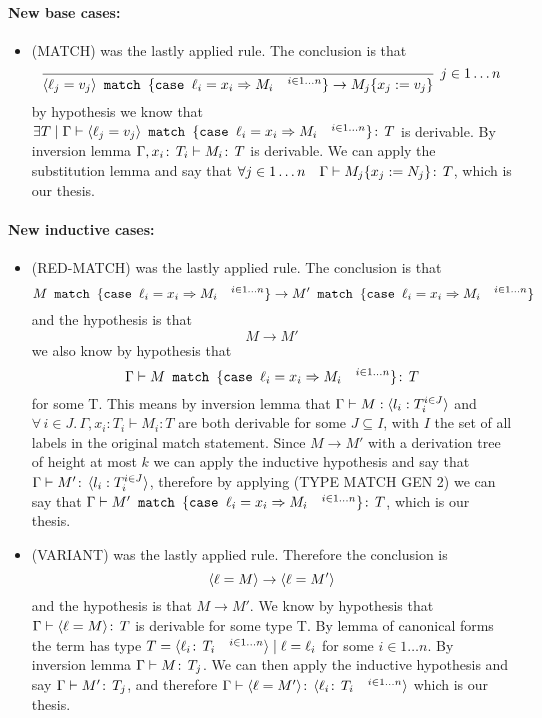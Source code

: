 \paragraph*{New base cases:\\}
\begin{itemize}
\item (MATCH) was the lastly applied rule. The conclusion is
  that \[\infer[j\in 1\dots n]{\MATCH{\VAR{\ell_j = v_j} }{
      \CASE{\ell_i}{x_i}{M_i} \quad^{i\in 1\dots n}} \to
    M_j\SUBST{x_j}{v_j}}{}\] by hypothesis we know that \(\exists T
  \mid \Gamma \vdash \langle \ell_j = v_j \rangle\texttt{ match }\{
    \texttt{case }\ell_i = x_i \Rightarrow M_i \quad^{i\in 1\dots n}\} \!:\,T\) is
  derivable. By inversion lemma \(\Gamma, x_i \!:\,T_i \vdash M_i
  \!:\,T\) is derivable. We can apply the substitution lemma and say
  that \(\forall j \in 1 \dots n \quad \Gamma \vdash M_j
  \{x_j:=N_j\} \!:\,T\), which is our thesis.
\end{itemize}

\paragraph*{New inductive cases:\\}
\begin{itemize}
\item (RED-MATCH) was the lastly applied rule. The conclusion is
  that \[M\texttt{ match }\{\texttt{case }\ell_i = x_i \Rightarrow M_i \quad ^{i\in 1\dots n}\} \to
  M'\texttt{ match }\{\texttt{case }\ell_i = x_i \Rightarrow M_i \quad ^{i\in 1\dots n}\}\] and the
  hypothesis is that \[M\to M'\] we also know by hypothesis
  that \[\Gamma \vdash M\texttt{ match }\{\texttt{case }\ell_i = x_i \Rightarrow M_i \quad ^{i\in
      1\dots n}\} \!:\,T\] for some T. This means by inversion lemma
  that \(\Gamma \vdash M: \langle l_i: T_i^{i \in J} \rangle\) and \(\forall\,
  i \in J.\,\Gamma, x_i: T_i \vdash M_i: T\) are both derivable for
  some \(J\subseteq I\), with \(I\) the set of all labels in the
  original match statement. Since \(M\to M'\) with a derivation tree
  of height at most \(k\) we can apply the inductive hypothesis and
  say that \(\Gamma \vdash M' \!:\,\langle l_i: T_i^{i \in J} \rangle\),
  therefore by applying (TYPE MATCH GEN 2) we can say that
  \(\Gamma\vdash M'\texttt{ match }\{\texttt{case }\ell_i = x_i \Rightarrow M_i \quad ^{i\in
      1\dots n}\} \!:\,T\), which is our thesis.
\item (VARIANT) was the lastly applied rule. Therefore the conclusion
  is \[\langle \ell = M \rangle \to \langle \ell = M' \rangle\] and the hypothesis is that
  \(M\to M'\). We know by hypothesis that \(\Gamma \vdash \langle \ell =
    M \rangle \!:\,T\) is derivable for some type T. By lemma of canonical
  forms the term has type \(T = \langle \ell_i \!:\,T_i \quad^{i\in
      1\dots n} \rangle \mid \ell = \ell_i\) for some \(i\in 1\dots n\). By
  inversion lemma \(\Gamma \vdash M \!:\,T_j\). We can then apply
  the inductive hypothesis and say \(\Gamma \vdash M' \!:\,T_j\),
  and therefore \(\Gamma \vdash \langle \ell = M' \rangle\!:\,\langle \ell_i
      \!:\,T_i \quad^{i\in 1\dots n} \rangle\) which is our thesis.
\end{itemize}


